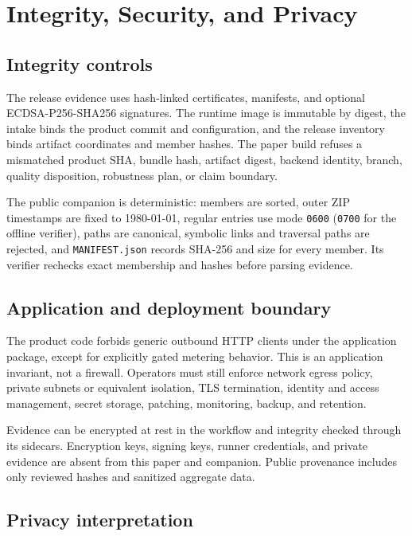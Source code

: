 \section{Integrity, Security, and Privacy}

\subsection{Integrity controls}

The release evidence uses hash-linked certificates, manifests, and optional ECDSA-P256-SHA256
signatures. The runtime image is immutable by digest, the intake binds the product commit and
configuration, and the release inventory binds artifact coordinates and member hashes. The paper
build refuses a mismatched product SHA, bundle hash, artifact digest, backend identity, branch,
quality disposition, robustness plan, or claim boundary.

The public companion is deterministic: members are sorted, outer ZIP timestamps are fixed to
1980-01-01, regular entries use mode \texttt{0600} (\texttt{0700} for the offline verifier), paths
are canonical, symbolic links and traversal paths are rejected, and \texttt{MANIFEST.json}
records SHA-256 and size for every member. Its verifier rechecks exact membership and hashes before
parsing evidence.

\subsection{Application and deployment boundary}

The product code forbids generic outbound HTTP clients under the application package, except for
explicitly gated metering behavior. This is an application invariant, not a firewall. Operators must
still enforce network egress policy, private subnets or equivalent isolation, TLS termination,
identity and access management, secret storage, patching, monitoring, backup, and retention.

Evidence can be encrypted at rest in the workflow and integrity checked through its sidecars.
Encryption keys, signing keys, runner credentials, and private evidence are absent from this paper
and companion. Public provenance includes only reviewed hashes and sanitized aggregate data.

\subsection{Privacy interpretation}

